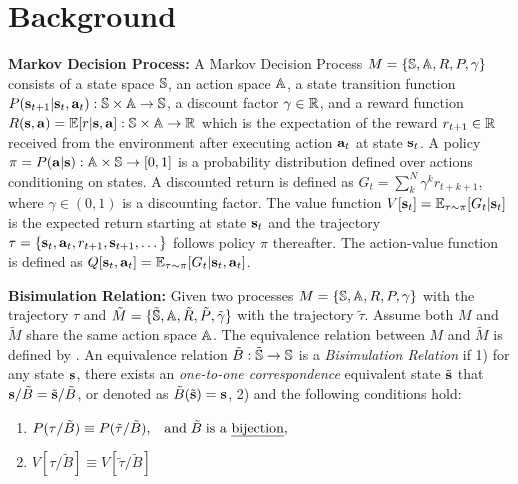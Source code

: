 \documentclass[10pt,journal,compsoc]{IEEEtran}
\renewcommand{\citename}{\citet}
\renewcommand{\cite}{\citep}
\begin{document}


\section{Background}
\label{sec:smdp_option}

\textbf{Markov Decision Process:} A Markov Decision Process
\cite{puterman2014markov} $M=\{{\mathbb{S}},{\mathbb{A}},R,P,\gamma\}$ consists of
a state space ${\mathbb{S}}$, an action space ${\mathbb{A}}$, a state transition
function $P({\mathbf{s}}_{t+1}|{\mathbf{s}}_t,{\mathbf{a}}_t):
{\mathbb{S}}\times{\mathbb{A}}\rightarrow{\mathbb{S}}$, a discount factor $\gamma\in{\mathbb{R}}$,
and a reward function
$R({\mathbf{s}},{\mathbf{a}})=\mathbb{E}[r|{\mathbf{s}},{\mathbf{a}}]:{\mathbb{S}}\times{\mathbb{A}}\rightarrow{\mathbb{R}}$ which
is the expectation of the reward $r_{t+1}\in{\mathbb{R}}$ received from
the environment after executing action ${\mathbf{a}}_t$ at state
${\mathbf{s}}_t$. A policy
$\pi=P({\mathbf{a}}|{\mathbf{s}}):{\mathbb{A}}\times{\mathbb{S}}\rightarrow[0,1]$ is a probability
distribution defined over actions conditioning on states. A
discounted return is defined as $G_t =
\sum_k^N\gamma^kr_{t+k+1}$, where $\gamma\in (0,1)$ is a
discounting factor. The value function
$V[{\mathbf{s}}_t]=\mathbb{E}_{\tau\sim\pi}[G_t|{\mathbf{s}}_t]$ is the expected return
starting at state ${\mathbf{s}}_t$ and the trajectory
$\tau=\{{\mathbf{s}}_t,{\mathbf{a}}_t,r_{t+1},{\mathbf{s}}_{t+1},\dots\}$ follows policy
$\pi$ thereafter. The action-value function is defined as
$Q[{\mathbf{s}}_t,{\mathbf{a}}_t]= \mathbb{E}_{\tau\sim\pi}[G_t|{\mathbf{s}}_t,{\mathbf{a}}_t]$.

\textbf{Bisimulation Relation:} Given two processes
$M=\{{\mathbb{S}},{\mathbb{A}},R,P,\gamma\}$ with the trajectory $\tau$ and
$\tilde{M}=\{\tilde{{\mathbb{S}}},{\mathbb{A}},\tilde{R},\tilde{P},\tilde{\gamma}\}$
with the trajectory $\tilde{\tau}$. Assume both $M$ and
$\tilde{M}$ share the same action space ${\mathbb{A}}$. The equivalence
relation between $M$ and $\tilde{M}$ is defined by
\citename{givan2003equivalence}. An equivalence relation
$\tilde{B}:\tilde{{\mathbb{S}}}\rightarrow{\mathbb{S}}$ is a \emph{Bisimulation
  Relation} if 1) for any state ${\mathbf{s}}$, there exists an
\emph{one-to-one correspondence} equivalent state $\tilde{{\mathbf{s}}}$
that ${\mathbf{s}}/\tilde{B}=\tilde{{\mathbf{s}}}/\tilde{B}$, or denoted as
$\tilde{B}(\tilde{{\mathbf{s}}})={\mathbf{s}}$, 2) and the following conditions
hold:
\begin{enumerate}
  \label{def:bisimulate}
\item
  $P(\tau/\tilde{B})\equiv
  P(\tilde{\tau}/\tilde{B}),\;\;\;
  \text{and\;}\tilde{B} \text{\;is a \emph{bijection}},$\\
\item
  $V[\tau/\tilde{B}]\equiv
  V[\tilde{\tau}/\tilde{B}]$
\end{enumerate}
\end{document}
